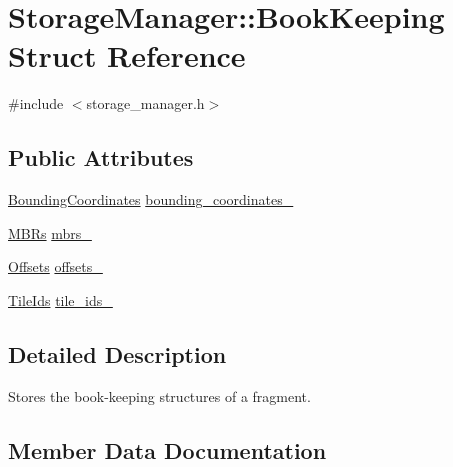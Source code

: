 \hypertarget{structStorageManager_1_1BookKeeping}{}\section{Storage\+Manager\+:\+:Book\+Keeping Struct Reference}
\label{structStorageManager_1_1BookKeeping}


{\ttfamily \#include $<$storage\+\_\+manager.\+h$>$}

\subsection*{Public Attributes}
\begin{DoxyCompactItemize}
\item 
\hyperlink{classStorageManager_ab527f4f911acfefc5c92ecaddec41300}{Bounding\+Coordinates} \hyperlink{structStorageManager_1_1BookKeeping_a8d46a9e72e076042244bdd1cad013a58}{bounding\+\_\+coordinates\+\_\+}
\item 
\hyperlink{classStorageManager_a09f09fbac76952a268f77ac049da4070}{M\+B\+Rs} \hyperlink{structStorageManager_1_1BookKeeping_afb93dbd71b4beccc5333274405c25b32}{mbrs\+\_\+}
\item 
\hyperlink{classStorageManager_a92535a9b1da2da9098d241c0ea6e1bea}{Offsets} \hyperlink{structStorageManager_1_1BookKeeping_a85d5746c7bbe9b8c1a3fd2de29c625de}{offsets\+\_\+}
\item 
\hyperlink{classStorageManager_a201ad7c940545c292d5b1d28c628e848}{Tile\+Ids} \hyperlink{structStorageManager_1_1BookKeeping_a1ff94988c8f84868aade610291cd347c}{tile\+\_\+ids\+\_\+}
\end{DoxyCompactItemize}


\subsection{Detailed Description}
Stores the book-\/keeping structures of a fragment. 

\subsection{Member Data Documentation}
\hypertarget{structStorageManager_1_1BookKeeping_a8d46a9e72e076042244bdd1cad013a58}{}
